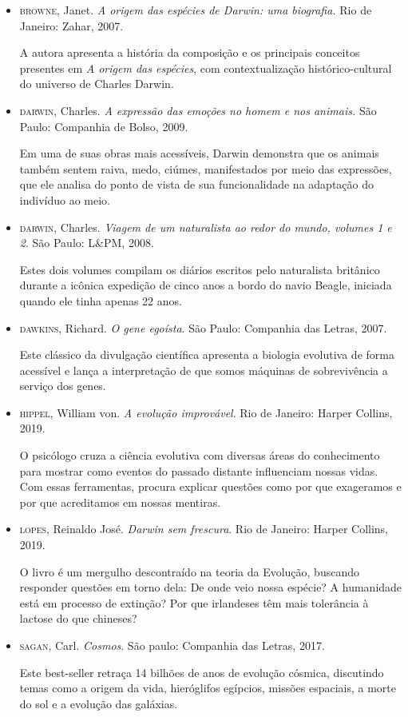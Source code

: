 \documentclass[11pt]{extarticle}
\begin{document}
\begin{itemize}
\item \textsc{browne}, Janet. \emph{A origem das espécies de Darwin: uma biografia.}  Rio de
Janeiro: Zahar, 2007.

A autora apresenta a história da composição e os principais conceitos
presentes em \emph{A origem das espécies}, com contextualização
histórico-cultural do universo de Charles Darwin.

\item \textsc{darwin}, Charles. \emph{A expressão das emoções no homem e nos animais.} São
Paulo: Companhia de Bolso, 2009.

Em uma de suas obras mais acessíveis, Darwin demonstra que os animais também
sentem raiva, medo, ciúmes, manifestados por meio das expressões, que ele
analisa do ponto de vista de sua funcionalidade na adaptação do indivíduo ao
meio.

\item \textsc{darwin}, Charles. \emph{Viagem de um naturalista ao redor do mundo, volumes
1 e 2}. São Paulo: L\&PM, 2008.

Estes dois volumes compilam os diários escritos pelo naturalista britânico
durante a icônica expedição de cinco anos a bordo do navio Beagle, iniciada
quando ele tinha apenas 22 anos.


\item \textsc{dawkins}, Richard. \emph{O gene egoísta}. São Paulo: Companhia das Letras,
2007.

Este clássico da divulgação científica apresenta a biologia evolutiva de forma
acessível e lança a interpretação de que somos máquinas de sobrevivência
a serviço dos genes.

\item \textsc{hippel}, William von. \emph{A evolução improvável}. Rio de Janeiro: Harper
Collins, 2019.

O psicólogo cruza a ciência evolutiva com diversas áreas do conhecimento para
mostrar como eventos do passado distante influenciam nossas vidas.  Com essas
ferramentas, procura explicar questões como por que exageramos e por que
acreditamos em nossas mentiras.

\item \textsc{lopes}, Reinaldo José. \emph{Darwin sem frescura}. Rio de Janeiro: Harper
Collins, 2019.

O livro é um mergulho descontraído na teoria da Evolução, buscando responder
questões em torno dela: De onde veio nossa espécie? A humanidade está em
processo de extinção? Por que irlandeses têm mais tolerância à lactose do que
chineses?

\item \textsc{sagan}, Carl. \emph{Cosmos}. São paulo: Companhia das Letras, 2017.

Este best-seller retraça 14 bilhões de anos de evolução cósmica, discutindo
temas como a origem da vida, hieróglifos egípcios, missões espaciais, a morte
do sol e a evolução das galáxias.
\end{itemize}
\end{document}
